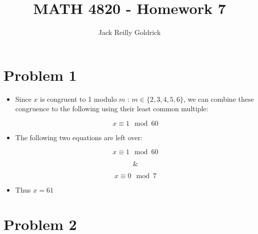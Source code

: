 \documentclass[]{report}
\title{MATH 4820 - Homework 7}
\author{Jack Reilly Goldrick}
\begin{document}
	\maketitle

\section{Problem 1}


\begin{itemize}
	\item Since $x$ is congruent to 1 modulo $m$ : $m \in \{2, 3, 4, 5, 6\} $, we can combine these congruence to the following using their least common multiple:
	
	
	$$ x \equiv 1 \mod 60 $$
	
	
	\item The following two equations are left over:
	
	$$ x \equiv 1 \mod 60 $$
	
	$$ \& $$

	$$ x \equiv 0 \mod 7 $$
	
	
	
	\item Thus $x=61$
	
	
	
	
\end{itemize}



\newpage



\section{Problem 2}
\end{document}

